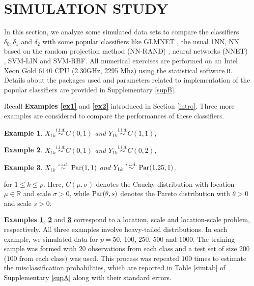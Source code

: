 \documentclass[twoside]{article}
\newcommand{\bF}{\mathbf{F}}
\newcommand{\0}{\mathbf{0}}
\newcommand{\1}{\mathbf{1}}
\numberwithin{equation}{section}
\newtheorem{ex}{Example}
\begin{document}
\section{SIMULATION STUDY}\label{sim}
In this section, we analyze some simulated data sets to compare the classifiers $\delta_0,\delta_1$ and $\delta_2$ with some popular classifiers like GLMNET \citep{hastie2009elements}, the usual 1NN, NN based on the random projection method (NN-RAND) \citep{deegalla2006reducing}, neural networks (NNET) \citep{bishop1995neural}, SVM-LIN and SVM-RBF. All numerical exercises are performed on an Intel Xeon Gold 6140 CPU (2.30GHz, 2295 Mhz) using the  statistical software {\tt R}. Details about the packages used and parameters related to implementation of the popular classifiers are provided in Supplementary \ref{supB}.

Recall {\bf Examples \ref{ex1}} and {\bf \ref{ex2}} introduced in Section \ref{intro}. Three more examples are considered to compare the performances of these classifiers.
\vspace{-0.15cm}
\begin{ex}\label{ex3}
 $X_{1k}\stackrel{i.i.d.}{\sim} C(0,1)$ and $Y_{1k}\stackrel{i.i.d.}{\sim} C(1,1)$,
\end{ex}
\vspace{-0.15cm}
\begin{ex}\label{ex4}
$X_{1k}\stackrel{i.i.d.}{\sim} C(0,1)$ and $Y_{1k}\stackrel{i.i.d.}{\sim} C(0,2)$,
\end{ex}
\vspace{-0.15cm}
\begin{ex}\label{ex5}
 $X_{1k}$ $\stackrel{i.i.d.}{\sim}$ ${\rm Par}(1,1)$ and $Y_{1k}\stackrel{i.i.d.}{\sim}{\rm Par}(1.25,1)$,
\end{ex}
\vspace{-0.15cm}
for $1\le k\le p$. Here, $C(\mu,\sigma)$ denotes the Cauchy distribution with location $\mu\in\mathbb{R}$ and scale $\sigma>0$, while ${\rm Par}(\theta,s)$ denotes the Pareto distribution with $\theta>0$ and scale $s>0$.

{\bf Examples \ref{ex3}}, {\bf \ref{ex4}} and {\bf \ref{ex5}} correspond to a location, scale and  location-scale problem, respectively. All three examples involve heavy-tailed distributions. %
In each example, we simulated data for $p=50$, $100$, $250$, $500$ and $1000$. The training sample was formed with $20$ observations from each class and a test set of size $200$ ($100$ from each class) was used. This process was repeated $100$ times to estimate the misclassification probabilities, which are reported in Table \ref{simtab} of Supplementary \ref{supA} along with their standard errors.
\end{document}
